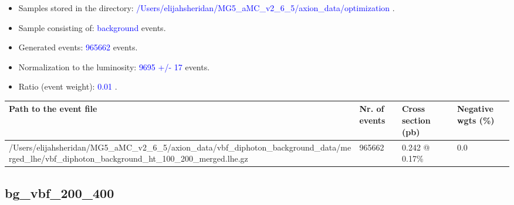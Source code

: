 \documentclass[a4paper, 10pt]{article}
\begin{document}
\begin{itemize}
  \item Samples stored in the directory: \textcolor{blue}{/\-Users/\-elijahsheridan/\-MG5\_aMC\_v2\_6\_5/\-axion\_data/\-optimization} .
   \item Sample consisting of: \textcolor{blue}{background}  events.
   \item Generated events: \textcolor{blue}{965662 }  events.
   \item Normalization to the luminosity: \textcolor{blue}{9695}\textcolor{blue}{ +/\-- }\textcolor{blue}{17 }  events.
   \item Ratio (event weight): \textcolor{blue}{0.01 } .  
 
\end{itemize}
\begin{table}[H]
  \begin{center}
    \begin{tabular}{|m{55.0mm}|m{25.0mm}|m{30.0mm}|m{30.0mm}|}
      \hline
      {\cellcolor{yellow}         Path to the event file}& {\cellcolor{yellow}         Nr. of events}& {\cellcolor{yellow}         Cross section (pb)}& {\cellcolor{yellow}         Negative wgts (\%)}\\
      \hline
      {\cellcolor{white}          /\-Users/\-elijahsheridan/\-MG5\_aMC\_v2\_6\_5/\-axion\_data/\-vbf\_diphoton\_background\_data/\-merged\_lhe/\-vbf\_diphoton\_background\_ht\_100\_200\_merged.lhe.gz}& {\cellcolor{white}          965662}& {\cellcolor{white}          0.242 @ 0.17\%}& {\cellcolor{white}          0.0}\\
\hline
    \end{tabular}
  \end{center}
\end{table}

\subsection{ bg\_vbf\_200\_400}
\end{document}
